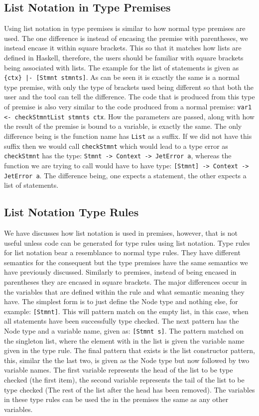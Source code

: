 \subsection{List Notation in Type Premises}
Using list notation in type premises is similar to how normal type premises are used.
The one difference is instead of encasing the premise with parentheses, we instead encase it within square brackets.
This so that it matches how lists are defined in Haskell, therefore, the users should be familiar with square brackets being associated with lists.
The example for the list of statements is given as \texttt{\{ctx\} |- [Stmnt stmnts]}.
As can be seen it is exactly the same is a normal type premise, with only the type of brackets used being different so that both the user and the tool can tell the difference.
The code that is produced from this type of premise is also very similar to the code produced from a normal premise: \texttt{var1 <- checkStmntList stmnts ctx}.
How the parameters are passed, along with how the result of the premise is bound to a variable, is exactly the same.
The only difference being is the function name has \texttt{List} as a suffix.
If we did not have this suffix then we would call \texttt{checkStmnt} which would lead to a type error as \texttt{checkStmnt} has the type: \texttt{Stmnt -> Context -> JetError a}, whereas the function we are trying to call would have to have type: \texttt{[Stmnt] -> Context -> JetError a}.
The difference being, one expects a statement, the other expects a list of statements.

\subsection{List Notation Type Rules}
We have discusses how list notation is used in premises, however, that is not useful unless code can be generated for type rules using list notation.
Type rules for list notation bear a resemblance to normal type rules.
They have different semantics for the consequent but the type premises have the same semantics we have previously discussed.
Similarly to premises, instead of being encased in parentheses they are encased in square brackets.
The major differences occur in the variables that are defined within the rule and what semantic meaning they have.
The simplest form is to just define the Node type and nothing else, for example: \texttt{[Stmnt]}.
This will pattern match on the empty list, in this case, when all statements have been successfully type checked.
The next pattern has the Node type and a variable name, given as: \texttt{[Stmnt s]}.
The pattern matched on the singleton list, where the element with in the list is given the variable name given in the type rule.
The final pattern that exists is the list constructor pattern, this, similar the the last two,  is given as the Node type but now followed by two variable names.
The first variable represents the head of the list to be type checked (the first item), the second variable represents the tail of the list to be type checked (The rest of the list after the head has been removed).
The variables in these type rules can be used the in the premises the same as any other variables.

